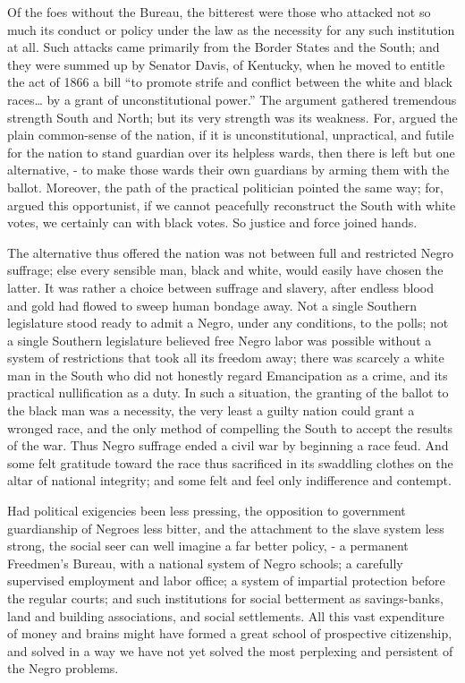 Of the foes without the Bureau, the bitterest were those who attacked not so much its conduct or policy under the law as the necessity for any such institution at all. Such attacks came primarily from the Border States and the South; and they were summed up by Senator Davis, of Kentucky, when he moved to entitle the act of 1866 a bill “to promote strife and conflict between the white and black races… by a grant of unconstitutional power.” The argument gathered tremendous strength South and North; but its very strength was its weakness. For, argued the plain common-sense of the nation, if it is unconstitutional, unpractical, and futile for the nation to stand guardian over its helpless wards, then there is left but one alternative, - to make those wards their own guardians by arming them with the ballot. Moreover, the path of the practical politician pointed the same way; for, argued this opportunist, if we cannot peacefully reconstruct the South with white votes, we certainly can with black votes. So justice and force joined hands.\par

The alternative thus offered the nation was not between full and restricted Negro suffrage; else every sensible man, black and white, would easily have chosen the latter. It was rather a choice between suffrage and slavery, after endless blood and gold had flowed to sweep human bondage away. Not a single Southern legislature stood ready to admit a Negro, under any conditions, to the polls; not a single Southern legislature believed free Negro labor was possible without a system of restrictions that took all its freedom away; there was scarcely a white man in the South who did not honestly regard Emancipation as a crime, and its practical nullification as a duty. In such a situation, the granting of the ballot to the black man was a necessity, the very least a guilty nation could grant a wronged race, and the only method of compelling the South to accept the results of the war. Thus Negro suffrage ended a civil war by beginning a race feud. And some felt gratitude toward the race thus sacrificed in its swaddling clothes on the altar of national integrity; and some felt and feel only indifference and contempt.\par

Had political exigencies been less pressing, the opposition to government guardianship of Negroes less bitter, and the attachment to the slave system less strong, the social seer can well imagine a far better policy, - a permanent Freedmen’s Bureau, with a national system of Negro schools; a carefully supervised employment and labor office; a system of impartial protection before the regular courts; and such institutions for social betterment as savings-banks, land and building associations, and social settlements. All this vast expenditure of money and brains might have formed a great school of prospective citizenship, and solved in a way we have not yet solved the most perplexing and persistent of the Negro problems.\par

